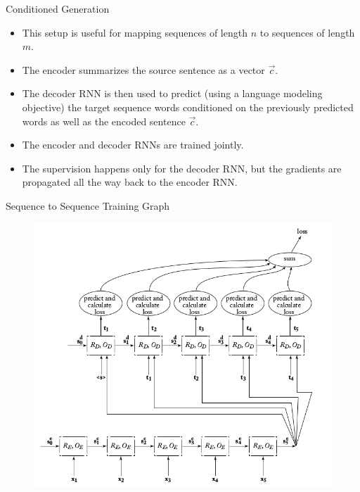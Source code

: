 \begin{frame}{Conditioned Generation}
\begin{scriptsize}
\begin{itemize}
\item This setup is useful for mapping sequences of length $n$ to sequences of length $m$.
\item The encoder summarizes the source sentence as a vector $\vec{c}$.
\item The decoder RNN is then used to predict (using a language modeling objective) the target sequence words conditioned on the previously predicted words as well as the encoded sentence $\vec{c}$.
\item The encoder and decoder RNNs are trained jointly.
\item The supervision happens only for the decoder RNN, but the gradients are propagated all the way back to the encoder RNN.
\end{itemize}
\end{scriptsize}
\end{frame}


\begin{frame}{Sequence to Sequence Training Graph}
         \begin{figure}[h]
        	\includegraphics[scale = 0.35]{pics/seq2se2train.png}
        \end{figure}  
    
\end{frame}





